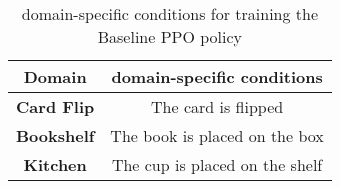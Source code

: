 \begin{table}[H]
\centering
\begin{tabular}{|c|c|}
\hline
\textbf{Domain} & \multicolumn{1}{c|}{domain-specific conditions} \\ \hline
\textbf{Card Flip} & \multicolumn{1}{c|}{The card is flipped} \\ \hline
\textbf{Bookshelf} & \multicolumn{1}{c|}{The book is placed on the box} \\ \hline
\textbf{Kitchen} & \multicolumn{1}{c|}{The cup is placed on the shelf} \\ \hline
\end{tabular}
\caption{domain-specific conditions for training the Baseline PPO policy}\label{table:PPO_reward_condition}
\end{table}